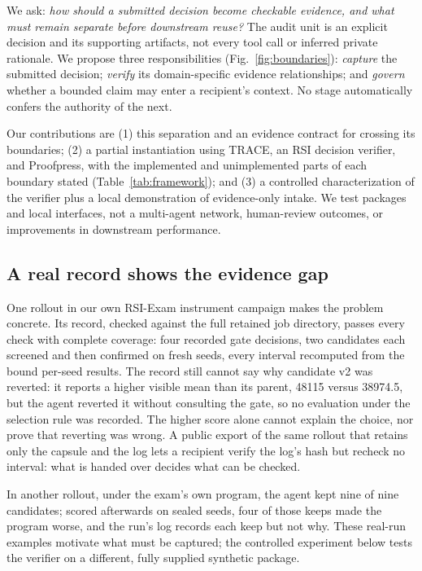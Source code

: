 \documentclass[conference]{IEEEtran}
\begin{document}
We ask: \emph{how should a submitted decision become checkable evidence, and what must remain separate before downstream reuse?} The audit unit is an explicit decision and its supporting artifacts, not every tool call or inferred private rationale. We propose three responsibilities (Fig.~\ref{fig:boundaries}): \emph{capture} the submitted decision; \emph{verify} its domain-specific evidence relationships; and \emph{govern} whether a bounded claim may enter a recipient's context. No stage automatically confers the authority of the next.

Our contributions are (1) this separation and an evidence contract for crossing its boundaries; (2) a partial instantiation using TRACE, an RSI decision verifier, and Proofpress, with the implemented and unimplemented parts of each boundary stated (Table~\ref{tab:framework}); and (3) a controlled characterization of the verifier plus a local demonstration of evidence-only intake. We test packages and local interfaces, not a multi-agent network, human-review outcomes, or improvements in downstream performance.

\subsection{A real record shows the evidence gap}
One rollout in our own RSI-Exam instrument campaign makes the problem concrete. Its record, checked against the full retained job directory, passes every check with complete coverage: four recorded gate decisions, two candidates each screened and then confirmed on fresh seeds, every interval recomputed from the bound per-seed results. The record still cannot say why candidate v2 was reverted: it reports a higher visible mean than its parent, 48115 versus 38974.5, but the agent reverted it without consulting the gate, so no evaluation under the selection rule was recorded. The higher score alone cannot explain the choice, nor prove that reverting was wrong. A public export of the same rollout that retains only the capsule and the log lets a recipient verify the log's hash but recheck no interval: what is handed over decides what can be checked.

In another rollout, under the exam's own program, the agent kept nine of nine candidates; scored afterwards on sealed seeds, four of those keeps made the program worse, and the run's log records each keep but not why. These real-run examples motivate what must be captured; the controlled experiment below tests the verifier on a different, fully supplied synthetic package.
\end{document}
